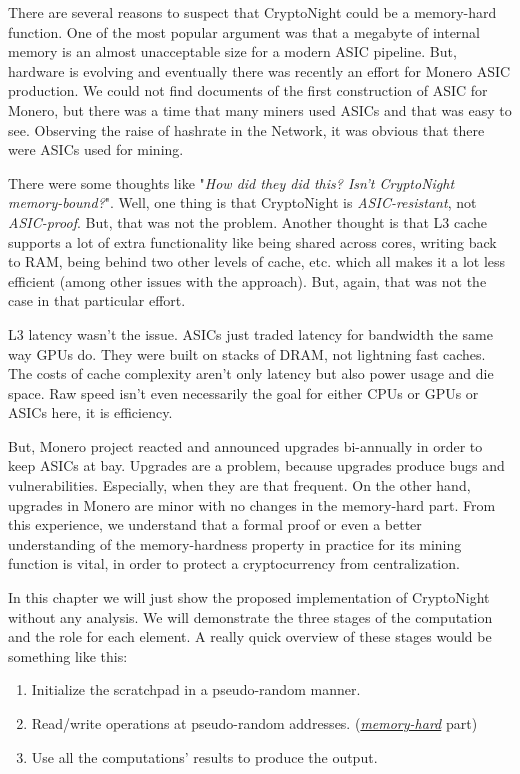 There are several reasons to suspect that CryptoNight could be a memory-hard function. One of the most popular argument was that a megabyte of internal memory is an almost unacceptable size for a modern ASIC pipeline. But, hardware is evolving and eventually there was recently an effort for Monero ASIC production. We could not find documents of the first construction of ASIC for Monero, but there was a time that many miners used ASICs and that was easy to see. Observing the raise of hashrate in the Network, it was obvious that there were ASICs used for mining.

There were some thoughts like "\emph{How did they did this? Isn't CryptoNight memory-bound?}". Well, one thing is that CryptoNight is \emph{ASIC-resistant}, not \emph{ASIC-proof}. But, that was not the problem. Another thought is that L3 cache supports a lot of extra functionality like being shared across cores, writing back to RAM, being behind two other levels of cache, etc. which all makes it a lot less efficient (among other issues with the approach). But, again, that was not the case in that particular effort.

L3 latency wasn't the issue. ASICs just traded latency for bandwidth the same way GPUs do. They were built on stacks of DRAM, not lightning fast caches. The costs of cache complexity aren't only latency but also power usage and die space. Raw speed isn't even necessarily the goal for either CPUs or GPUs or ASICs here, it is efficiency.

But, Monero project reacted and announced upgrades bi-annually in order to keep ASICs at bay. Upgrades are a problem, because upgrades produce bugs and vulnerabilities. Especially, when they are that frequent. On the other hand, upgrades in Monero are minor with no changes in the memory-hard part. From this experience, we understand that a formal proof or even a better understanding of the memory-hardness property in practice for its mining function is vital, in order to protect a cryptocurrency from centralization.

In this chapter we will just show the proposed implementation of CryptoNight without any analysis. We will demonstrate the three stages of the computation and the role for each element. A really quick overview of these stages would be something like this:

\begin{enumerate}
  \item Initialize the scratchpad in a pseudo-random manner.
  \item Read/write operations at pseudo-random addresses. (\hyperref[sec:memory-hard]{\emph{memory-hard}} part)
  \item Use all the computations' results to produce the output.
\end{enumerate}

